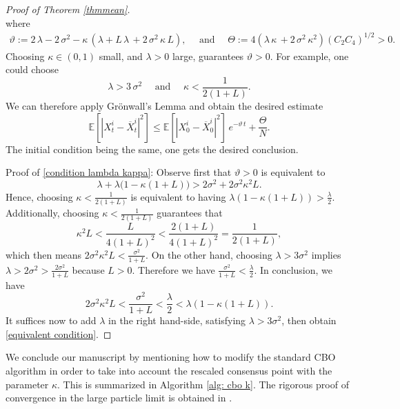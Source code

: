 \documentclass[12pt]{amsart}
\newcommand{\EE}{{\mathbb E}}
\numberwithin{equation}{section}
\begin{document}
\begin{proof}[Proof of Theorem \ref{thmmean}]
\begin{equation*}
\end{equation*}
where 
\begin{align*}
    \vartheta := 2\,\lambda -2\,\sigma^{2} - \kappa\,(\lambda + L\,\lambda\, + 2\,\sigma^{2}\,\kappa\,L), \quad \text{ and } \quad \Theta:= 4(\lambda\,\kappa\, + 2\,\sigma^{2}\,\kappa^{2})(C_2C_4)^{1/2} >0.
\end{align*}
Choosing $\kappa\in (0,1)$ small, and $\lambda>0$ large, guarantees $\vartheta>0$. For example, one could choose
\begin{equation}\label{condition lambda kappa}
    \lambda > 3\,\sigma^{2} \quad \text{ and } \quad  \kappa<\frac{1}{2(1+L)}.
\end{equation}
We can therefore apply Gr\"onwall's Lemma and obtain the desired estimate
\begin{equation*}
    \EE\left[|X^{i}_{t} - \overline{X}^{i}_{t}|^{2}\right] \leq  \EE\left[|X^{i}_{0} - \overline{X}^{i}_{0}|^{2}\right]\,e^{-\vartheta\, t} + \frac{\Theta}{N}.
\end{equation*}
The initial condition being the same, one gets the desired conclusion. 

Proof of \eqref{condition lambda kappa}: Observe first that $\vartheta>0$ is equivalent to  
\begin{equation}\label{equivalent condition}
\lambda + \lambda\big(1 - \kappa(1+L)\big) > 2\sigma^{2} + 2\sigma^{2}\kappa^{2}L.
\end{equation}
Hence, choosing $\kappa<\frac{1}{2(1+L)}$ is equivalent to having
\(
\lambda(1-\kappa(1+L)) > \frac{\lambda}{2}.
\)
Additionally,  choosing $\kappa<\frac{1}{2(1+L)}$ guarantees that 
\[
\kappa^{2}L< \frac{L}{4(1+L)^{2}} < \frac{2(1+L)}{4(1+L)^{2}} = \frac{1}{2(1+L)},
\]
which then means $2\sigma^{2}\kappa^{2}L < \frac{\sigma^{2}}{1+L}$. On the other hand, choosing $ \lambda > 3\sigma^{2}$ implies $\lambda > 2\sigma^{2} > \frac{2\sigma^{2}}{1+L}$ because $L>0$. Therefore we have $\frac{\sigma^{2}}{1+L} < \frac{\lambda}{2}$. In conclusion, we have 
\[
2\sigma^{2}\kappa^{2}L < \frac{\sigma^{2}}{1+L} < \frac{\lambda}{2} < \lambda(1-\kappa(1+L)).
\]
It suffices now to add $\lambda$ in the right hand-side, satisfying $\lambda> 3\sigma^{2}$, then obtain \eqref{equivalent condition}.
\end{proof}




We conclude our manuscript by mentioning how to modify the standard CBO algorithm in order to take into account the rescaled consensus point with the parameter $\kappa$. This is summarized in Algorithm \ref{alg: cbo k}. The rigorous proof of convergence in the large particle limit is obtained in \cite{huang2025faithful}.
\end{document}
